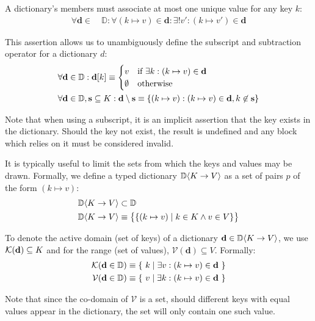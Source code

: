 A dictionary's members must associate at most one unique value for any key $k$:
\begin{align}
  \forall \mathbf{d} \in\ &\mathbb{D} : \forall (k \mapsto v) \in \mathbf{d} : \exists! v' : (k \mapsto v') \in \mathbf{d}
\end{align}

This assertion allows us to unambiguously define the subscript and subtraction operator for a dictionary $d$:
\begin{align}
  \forall \mathbf{d} \in \mathbb{D}&: \mathbf{d}[k] \equiv \begin{cases}
    v & \text{if}\ \exists k : (k \mapsto v) \in \mathbf{d} \\
    \emptyset & \text{otherwise}
  \end{cases}\\
  \forall \mathbf{d} \in \mathbb{D}&, \mathbf{s} \subseteq K: \mathbf{d} \setminus \mathbf{s} \equiv \{ (k \mapsto v): (k \mapsto v) \in \mathbf{d}, k \not \in \mathbf{s} \}
\end{align}

Note that when using a subscript, it is an implicit assertion that the key exists in the dictionary. Should the key not exist, the result is undefined and any block which relies on it must be considered invalid.

It is typically useful to limit the sets from which the keys and values may be drawn. Formally, we define a typed dictionary $\mathbb{D}\langle K\to V\rangle$ as a set of pairs $p$ of the form $(k \mapsto v)$:
\begin{align}
  \mathbb{D}\langle K\to V\rangle &\subset \mathbb{D} \\
  \mathbb{D}\langle K\to V\rangle &\equiv \big \{ \{ (k \mapsto v) \mid k \in K \wedge v \in V \} \big \}
\end{align}

To denote the active domain (\ie set of keys) of a dictionary $\mathbf{d} \in \mathbb{D}\langle K\to V\rangle$, we use $\mathcal{K}(\mathbf{d}) \subseteq K$ and for the range (\ie set of values), $\mathcal{V}(\mathbf{d}) \subseteq V$. Formally:
\begin{align}
  \mathcal{K}(\mathbf{d} \in \mathbb{D}) &\equiv \{\ k \mid \exists v : (k \mapsto v) \in \mathbf{d}\ \} \\
  \mathcal{V}(\mathbf{d} \in \mathbb{D}) &\equiv \{\ v \mid \exists k : (k \mapsto v) \in \mathbf{d}\ \}
\end{align}

Note that since the co-domain of $\mathcal{V}$ is a set, should different keys with equal values appear in the dictionary, the set will only contain one such value.

